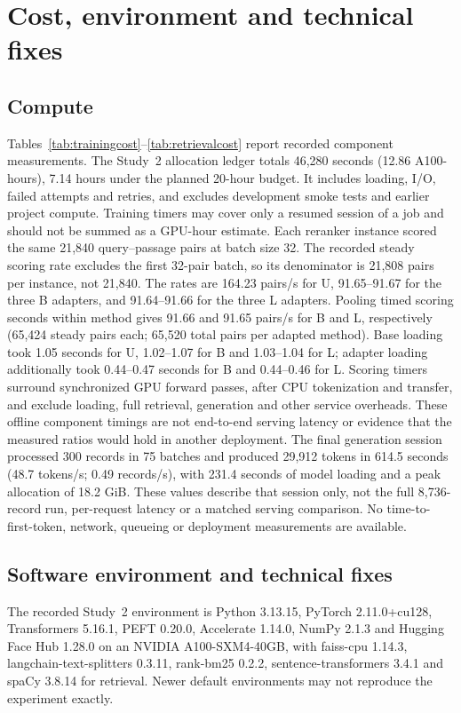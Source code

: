 \section{Cost, environment and technical fixes}\label{supp:cost}
\subsection{Compute}
Tables~\ref{tab:trainingcost}--\ref{tab:retrievalcost} report recorded component measurements. The Study~2 allocation ledger totals 46,280 seconds (12.86 A100-hours), 7.14 hours under the planned 20-hour budget. It includes loading, I/O, failed attempts and retries, and excludes development smoke tests and earlier project compute. Training timers may cover only a resumed session of a job and should not be summed as a GPU-hour estimate.
\FloatBarrier
\FloatBarrier
\FloatBarrier
Each reranker instance scored the same 21,840 query--passage pairs at batch size 32. The recorded steady scoring rate excludes the first 32-pair batch, so its denominator is 21,808 pairs per instance, not 21,840. The rates are 164.23 pairs/s for U, 91.65--91.67 for the three B adapters, and 91.64--91.66 for the three L adapters. Pooling timed scoring seconds within method gives 91.66 and 91.65 pairs/s for B and L, respectively (65,424 steady pairs each; 65,520 total pairs per adapted method). Base loading took 1.05 seconds for U, 1.02--1.07 for B and 1.03--1.04 for L; adapter loading additionally took 0.44--0.47 seconds for B and 0.44--0.46 for L. Scoring timers surround synchronized GPU forward passes, after CPU tokenization and transfer, and exclude loading, full retrieval, generation and other service overheads. These offline component timings are not end-to-end serving latency or evidence that the measured ratios would hold in another deployment.
The final generation session processed 300 records in 75 batches and produced 29,912 tokens in 614.5 seconds (48.7 tokens/s; 0.49 records/s), with 231.4 seconds of model loading and a peak allocation of 18.2 GiB. These values describe that session only, not the full 8,736-record run, per-request latency or a matched serving comparison. No time-to-first-token, network, queueing or deployment measurements are available.

\subsection{Software environment and technical fixes}
The recorded Study~2 environment is Python 3.13.15, PyTorch 2.11.0+cu128, Transformers 5.16.1, PEFT 0.20.0, Accelerate 1.14.0, NumPy 2.1.3 and Hugging Face Hub 1.28.0 on an NVIDIA A100-SXM4-40GB, with faiss-cpu 1.14.3, langchain-text-splitters 0.3.11, rank-bm25 0.2.2, sentence-transformers 3.4.1 and spaCy 3.8.14 for retrieval. Newer default environments may not reproduce the experiment exactly.

